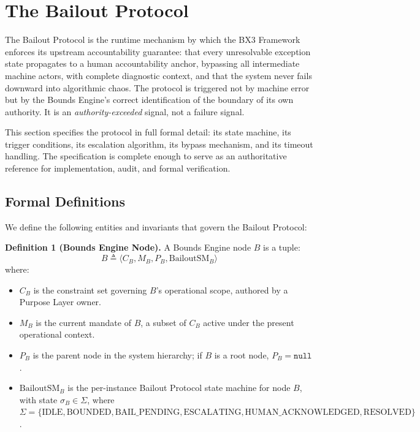\section{The Bailout Protocol}
\label{sec:bailout-protocol}

The Bailout Protocol is the runtime mechanism by which the BX3 Framework enforces its upstream accountability guarantee: that every unresolvable exception state propagates to a human accountability anchor, bypassing all intermediate machine actors, with complete diagnostic context, and that the system never fails downward into algorithmic chaos. The protocol is triggered not by machine error but by the Bounds Engine's correct identification of the boundary of its own authority. It is an \textit{authority-exceeded} signal, not a failure signal.

This section specifies the protocol in full formal detail: its state machine, its trigger conditions, its escalation algorithm, its bypass mechanism, and its timeout handling. The specification is complete enough to serve as an authoritative reference for implementation, audit, and formal verification.

\subsection{Formal Definitions}
\label{sec:formal-definitions}

We define the following entities and invariants that govern the Bailout Protocol:

\bigskip

\noindent\textbf{Definition 1 (Bounds Engine Node).} A Bounds Engine node $B$ is a tuple:
\begin{equation}
B \triangleq \langle C_B, M_B, P_B, \text{BailoutSM}_B \rangle
\end{equation}
where:
\begin{itemize}\setlength\itemsep{0.25em}
\item $C_B$ is the constraint set governing $B$'s operational scope, authored by a Purpose Layer owner.
\item $M_B$ is the current mandate of $B$, a subset of $C_B$ active under the present operational context.
\item $P_B$ is the parent node in the system hierarchy; if $B$ is a root node, $P_B = \texttt{null}$.
\item $\text{BailoutSM}_B$ is the per-instance Bailout Protocol state machine for node $B$, with state $\sigma_B \in \Sigma$, where $\Sigma = \{\text{IDLE}, \text{BOUNDED}, \text{BAIL\_PENDING}, \text{ESCALATING}, \text{HUMAN\_ACKNOWLEDGED}, \text{RESOLVED}\}$.
\end{itemize}

